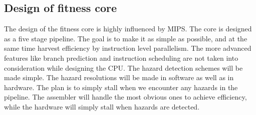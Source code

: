 \subsection{Design of fitness core}

The design of the fitness core is highly influenced by MIPS.
The core is designed as a five stage pipeline.
The goal is to make it as simple as possible, and at the same time harvest efficiency by instruction level parallelism.
The more advanced features like branch prediction and instruction scheduling are not taken into consideration while designing the CPU.
The hazard detection schemes will be made simple.
The hazard resolutions will be made in software as well as in hardware.
The plan is to simply stall when we encounter any hazards in the pipeline.
The assembler will handle the most obvious ones to achieve efficiency, while the hardware will simply stall when hazards are detected.


\subsubsection{}

